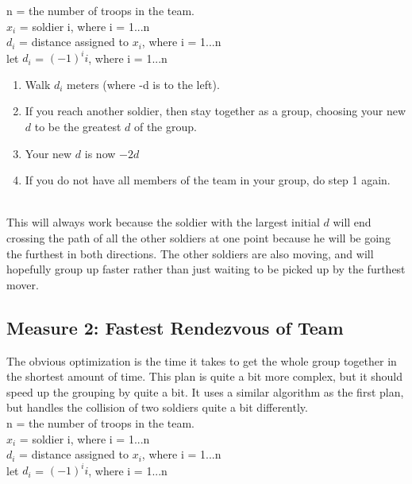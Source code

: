 \documentclass[a4paper,12pt]{article}
\begin{document}
\noindent n = the number of troops in the team.\\
\(x_i\) = soldier i, where i = 1...n \\
\(d_i\) = distance assigned to \(x_i\), where i = 1...n \\
let \(d_i\) = \((-1)^{i}i\), where i = 1...n \\

\begin{enumerate}
\item Walk \(d_i\) meters (where -d is to the left).
\item If you reach another soldier, then stay together as a group, choosing your new \(d\) to be
the greatest \(d\) of the group.
\item Your new \(d\) is now \(-2d\)
\item If you do not have all members of the team in your group, do step 1 again. 
\end{enumerate}

 \\
This will always work because the soldier with the largest initial \(d\) will end crossing the path
of all the other soldiers at one point because he will be going the furthest in both directions. The
other soldiers are also moving, and will hopefully group up faster rather than just waiting to be
picked up by the furthest mover.

\subsection{Measure 2: Fastest Rendezvous of Team}
The obvious optimization is the time it takes to get the whole group together in the shortest
amount of time. This plan is quite a bit more complex, but it should speed up the grouping by quite
a bit. It uses a similar algorithm as the first plan, but handles the collision of two soldiers quite a 
bit differently. \\

\noindent n = the number of troops in the team.\\
\(x_i\) = soldier i, where i = 1...n \\
\(d_i\) = distance assigned to \(x_i\), where i = 1...n \\
let \(d_i\) = \((-1)^{i}i\), where i = 1...n \\
\end{document}
